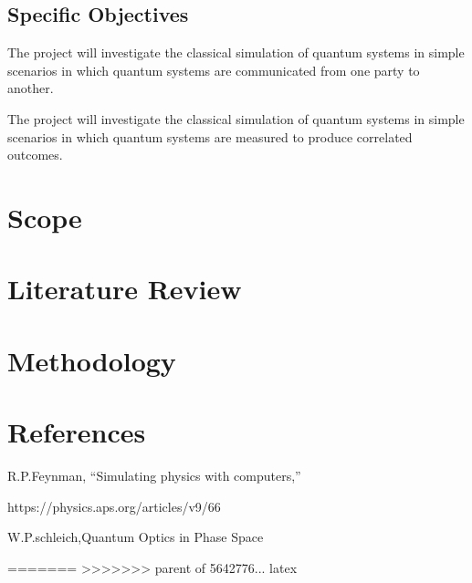 \documentclass[options]{article}
\begin{document}
\subsection{Specific Objectives}
The project will investigate the classical simulation of quantum systems in simple scenarios in which quantum systems are communicated from one party to another. 

The project will investigate the classical simulation of quantum systems in simple scenarios in which quantum systems are measured to produce correlated outcomes. 

\section {\textbf{Scope}}

\section{\textbf{Literature Review }}


\section {\textbf{Methodology}}

\section{\textbf{References}}
R.P.Feynman, “Simulating physics with computers,”

https://physics.aps.org/articles/v9/66 

W.P.schleich,Quantum Optics in Phase Space 



=======
>>>>>>> parent of 5642776... latex
\end{document}
